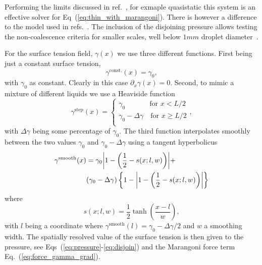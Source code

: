 \documentclass[twocolumn,amsmath,amssymb,showpacs,pre,nofootinbib,superscriptaddress]{revtex4-1} %
\begin{document}
Performing the limits discussed in ref.~\cite{PhysRevE.100.033313, PhysRevE.104.034801}, for exmaple quasistatic this system is an effective solver for Eq~(\ref{eq:thin_with_marangoni}).
There is however a difference to the model used in refs.~\cite{doi:10.1021/la500459v, karpitschka2014sharp}.
The inclusion of the disjoining pressure allows testing the non-coalescence criteria for smaller scales, well below $1mm$ droplet diameter~\cite{karpitschka2014sharp}.

For the surface tension field, $\gamma(x)$ we use three different functions. 
First being just a constant surface tension, 
\begin{equation}\label{eq:gamma_const}
    \gamma^{\text{const.}}(x) = \gamma_0,
\end{equation}
with $\gamma_0$ as constant.
Clearly in this case $\partial_x\gamma(x) = 0$.
Second, to mimic a mixture of different liquids we use a Heaviside function
\begin{equation}\label{eq:gamma_step}
    \gamma^{\text{step}}(x) = \begin{cases}
    \gamma_0\quad~~\qquad \text{for $x < L/2$}\\
    \gamma_0 - \Delta\gamma \quad \text{for $x \ge L/2$}\\
    \end{cases},
\end{equation}
with $\Delta\gamma$ being some percentage of $\gamma_0$.
The third function interpolates smoothly between the two values $\gamma_0$ and $\gamma_0 -\Delta\gamma$ using a tangent hyperbolicus
\begin{align}\label{eq:gamma_tanh}
    \gamma^{\text{smooth}}(x) &= \gamma_0\abs{1 - \left(\frac{1}{2} - s(x;l,w)\right)} + \nonumber\\
    &(\gamma_0 - \Delta\gamma)\left\{1 - \abs{1 - \left(\frac{1}{2} - s(x;l,w)\right)}\right\} 
\end{align}
where
\begin{equation}\label{eq:smoothing}
    s(x;l,w) = \frac{1}{2}\tanh\left(\frac{x - l}{w}\right),
\end{equation}
with $l$ being a coordinate where $\gamma^{\text{smooth}}(l) = \gamma_0 -\Delta\gamma/2$ and $w$ a smoothing width. 
The spatially resolved value of the surface tension is then given to the pressure, see Eqs~(\ref{eq:pressure}-\ref{eq:disjoin}) and the Marangoni force term Eq.~(\ref{eq:force_gamma_grad}).
\end{document}
